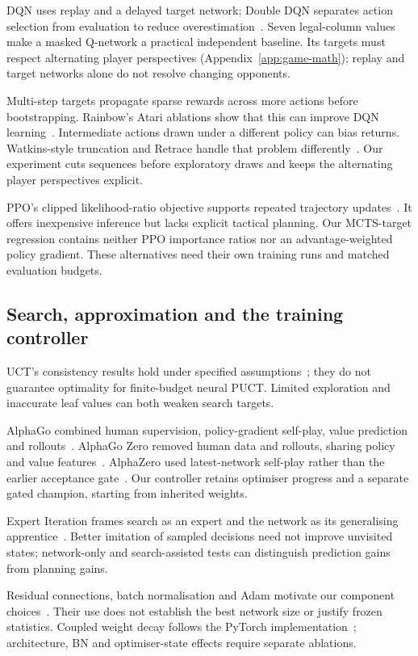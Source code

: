 \documentclass[letterpaper]{article}
\begin{document}
DQN uses replay and a delayed target network; Double DQN separates action
selection from evaluation to reduce overestimation~\cite{mnih2015,vanhasselt2016}.
Seven legal-column values make a masked Q-network a practical independent
baseline. Its targets must respect alternating player perspectives
(Appendix~\ref{app:game-math}); replay and target networks alone do not resolve
changing opponents.

Multi-step targets propagate sparse rewards across more actions before
bootstrapping. Rainbow's Atari ablations show that this can improve DQN
learning~\cite{hessel2018}. Intermediate actions drawn under a different
policy can bias returns. Watkins-style truncation and Retrace handle that
problem differently~\cite{munos2016}. Our experiment cuts sequences before
exploratory draws and keeps the alternating player perspectives explicit.

PPO's clipped likelihood-ratio objective supports repeated trajectory
updates~\cite{schulman2017}. It offers inexpensive inference but lacks explicit
tactical planning. Our MCTS-target regression contains neither PPO importance
ratios nor an advantage-weighted policy gradient. These alternatives need their
own training runs and matched evaluation budgets.

\subsection{Search, approximation and the training controller}
UCT's consistency results hold under specified assumptions~\cite{kocsis2006};
they do not guarantee optimality for finite-budget neural PUCT. Limited exploration
and inaccurate leaf values can both weaken search targets.

AlphaGo combined human supervision, policy-gradient self-play, value prediction
and rollouts~\cite{silver2016}. AlphaGo Zero removed human data and rollouts,
sharing policy and value features~\cite{silver2017zero}. AlphaZero used
latest-network self-play rather than the earlier acceptance gate~\cite{silver2018}.
Our controller retains optimiser progress and a separate gated champion, starting
from inherited weights.

Expert Iteration frames search as an expert and the network as its generalising
apprentice~\cite{anthony2017}. Better imitation of sampled decisions need not
improve unvisited states; network-only and search-assisted tests can distinguish
prediction gains from planning gains.

Residual connections, batch normalisation and Adam motivate our component
choices~\cite{he2016,ioffe2015,kingma2015}. Their use does not establish the best
network size or justify frozen statistics. Coupled weight decay follows the
PyTorch implementation~\cite{pytorch-adam}; architecture, BN and optimiser-state
effects require separate ablations.
\end{document}
